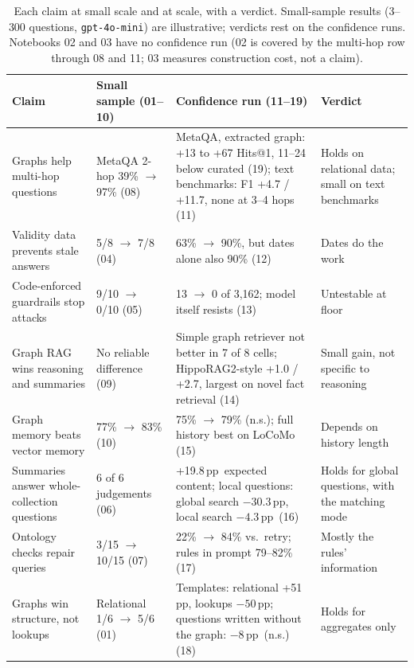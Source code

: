 \documentclass[11pt,a4paper]{article}
\newcommand{\pp}{\,pp}
\begin{document}
\begin{table}[t]
\centering
\small
\caption{Each claim at small scale and at scale, with a verdict. Small-sample results (3--300 questions,
\texttt{gpt-4o-mini}) are illustrative; verdicts rest on the confidence runs. Notebooks 02 and 03 have no
confidence run (02 is covered by the multi-hop row through 08 and 11; 03 measures construction cost, not a claim).}
\label{tab:verdict}
\begin{tabularx}{\textwidth}{@{}YYY>{\raggedright\arraybackslash}p{3.0cm}@{}}
\toprule
Claim & Small sample (01--10) & Confidence run (11--19) & Verdict \\
\midrule
Graphs help multi-hop questions & MetaQA 2-hop 39\% $\rightarrow$ 97\% (08) & MetaQA, extracted graph: +13 to +67 Hits@1, 11--24 below curated (19); text benchmarks: F1 +4.7 / +11.7, none at 3--4 hops (11) & Holds on relational data; small on text benchmarks \\
Validity data prevents stale answers & 5/8 $\rightarrow$ 7/8 (04) & 63\% $\rightarrow$ 90\%, but dates alone also 90\% (12) & Dates do the work \\
Code-enforced guardrails stop attacks & 9/10 $\rightarrow$ 0/10 (05) & 13 $\rightarrow$ 0 of 3{,}162; model itself resists (13) & Untestable at floor \\
Graph RAG wins reasoning and summaries & No reliable difference (09) & Simple graph retriever not better in 7 of 8 cells; HippoRAG2-style +1.0 / +2.7, largest on novel fact retrieval (14) & Small gain, not specific to reasoning \\
Graph memory beats vector memory & 77\% $\rightarrow$ 83\% (10) & 75\% $\rightarrow$ 79\% (n.s.); full history best on LoCoMo (15) & Depends on history length \\
Summaries answer whole-collection questions & 6 of 6 judgements (06) & +19.8\pp\ expected content; local questions: global search $-30.3$\pp, local search $-4.3$\pp\ (16) & Holds for global questions, with the matching mode \\
Ontology checks repair queries & 3/15 $\rightarrow$ 10/15 (07) & 22\% $\rightarrow$ 84\% vs.\ retry; rules in prompt 79--82\% (17) & Mostly the rules' information \\
Graphs win structure, not lookups & Relational 1/6 $\rightarrow$ 5/6 (01) & Templates: relational +51\pp, lookups $-50$\pp; questions written without the graph: $-8$\pp\ (n.s.) (18) & Holds for aggregates only \\
\bottomrule
\end{tabularx}
\end{table}
\end{document}
